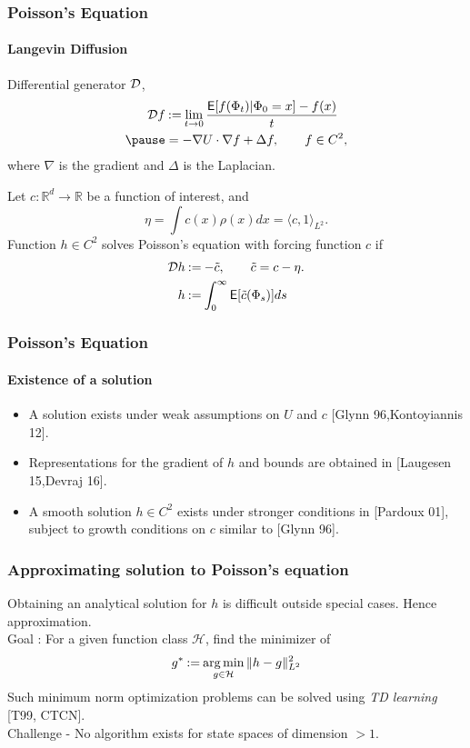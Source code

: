 \documentclass[xcolor=dvipsnames, subsection=false]{beamer}
\def\alertb#1{\alert{\color{BrickRed}  #1}}
\def\alertb#1{\alert{\color{BrickRed}  #1}}
\def\clH{{\mathcal H}}
\def\tilc{\tilde c}
\def\Expect{{\sf E}}
\newcommand{\field}[1]{\mathbb{#1}}
\def\Re{\field{R}}
\def\argmin{\mathop{\rm arg\, min}}
\def\eqdef{\mathbin{:=}}
\def\generate{{\cal D}}
\newcommand{\pot}{U}
\newcommand{\pr}{\rho}
\def\Expect{{\sf E}}
\def\bl#1{{\color{blue}#1}}
\begin{document}
\begin{frame}
\frametitle{Poisson's Equation}
\framesubtitle{Langevin Diffusion}
\alertb{Differential generator} $\generate$,
\[
\begin{aligned}
 \generate f &\eqdef \lim_{t\to 0} \frac{\Expect [f(\Phi_t)| \Phi_0 = x] - f(x)}{t} \\ \pause
 & = -\nabla \pot \cdot \nabla f + \Delta f,\qquad f\in C^2,
\label{e:Lfish}
\end{aligned}
\]
where $\nabla$ is the gradient and $\Delta$ is the Laplacian. \pause

Let $c \colon \Re^d \to \Re$ be a function of interest, and
\[
\eta = \int c(x) \pr(x) dx = \langle c, 1 \rangle_{L^2}.
\] \pause
Function $h\in C^2$ solves \alertb{Poisson's equation} with forcing function $c$ if
\[
\begin{aligned}
\generate h &\eqdef - \tilc, \qquad  \tilc = c - \eta. \\
h & \eqdef \int_0^\infty \Expect [\tilc(\Phi_s)] ds
\label{e:poissons}
\end{aligned}
\]
\end{frame}

\begin{frame}
\frametitle{Poisson's Equation}
\framesubtitle{Existence of a solution}
\begin{itemize}
\item A solution exists under weak assumptions on $\pot$ and $c$ \bl{[Glynn 96,Kontoyiannis 12]}.
\item Representations for the gradient of $h$ and bounds are obtained in \bl{[Laugesen 15,Devraj 16]}.
\item A smooth solution $h\in C^2$ exists under stronger conditions in \bl{[Pardoux 01]}, subject to growth conditions on $c$ similar to \bl{[Glynn 96]}.
\end{itemize}
\end{frame}

\begin{frame}
\frametitle{Approximating solution to Poisson's equation}
Obtaining an analytical solution for $h$ is difficult outside special cases. Hence approximation.\\[0.5cm] \pause
Goal : For a given function class $\clH$, find the minimizer of
\[
g^* \eqdef \argmin_{g \in \clH} \|h - g\|^2_{L^2}
\label{eq_td_learning_ls}
\]
Such minimum norm optimization problems can be solved using \textit{TD learning} \bl{[T99, CTCN]}.\\[0.5cm] \pause
\alertb{Challenge - No algorithm exists for state spaces of dimension $> 1$}.
\end{frame}
\end{document}
